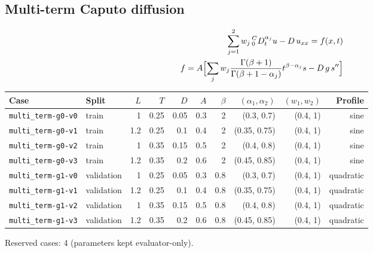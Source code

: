 \documentclass[11pt]{article}
\newcommand{\Caputo}[1]{{}^{C}_{0}D_t^{#1}}
\begin{document}
\subsection{Multi-term Caputo diffusion}
\begin{align*}
\sum_{j=1}^{2} w_j\,\Caputo{\alpha_j}u - D\,u_{xx} = f(x,t)\\
f = A\Bigl[\sum_j w_j\frac{\Gamma(\beta+1)}{\Gamma(\beta+1-\alpha_j)}t^{\beta-\alpha_j}s - D\,g\,s''\Bigr]
\end{align*}
\begin{center}\small
\begin{tabular}{llrrrrrrrr}
\toprule
Case & Split & $L$ & $T$ & $D$ & $A$ & $\beta$ & $(\alpha_1,\alpha_2)$ & $(w_1,w_2)$ & Profile \\
\midrule
\texttt{multi\_term-g0-v0} & train & 1 & 0.25 & 0.05 & 0.3 & 2 & (0.3, 0.7) & (0.4, 1) & sine \\
\texttt{multi\_term-g0-v1} & train & 1.2 & 0.25 & 0.1 & 0.4 & 2 & (0.35, 0.75) & (0.4, 1) & sine \\
\texttt{multi\_term-g0-v2} & train & 1 & 0.35 & 0.15 & 0.5 & 2 & (0.4, 0.8) & (0.4, 1) & sine \\
\texttt{multi\_term-g0-v3} & train & 1.2 & 0.35 & 0.2 & 0.6 & 2 & (0.45, 0.85) & (0.4, 1) & sine \\
\texttt{multi\_term-g1-v0} & validation & 1 & 0.25 & 0.05 & 0.3 & 0.8 & (0.3, 0.7) & (0.4, 1) & quadratic \\
\texttt{multi\_term-g1-v1} & validation & 1.2 & 0.25 & 0.1 & 0.4 & 0.8 & (0.35, 0.75) & (0.4, 1) & quadratic \\
\texttt{multi\_term-g1-v2} & validation & 1 & 0.35 & 0.15 & 0.5 & 0.8 & (0.4, 0.8) & (0.4, 1) & quadratic \\
\texttt{multi\_term-g1-v3} & validation & 1.2 & 0.35 & 0.2 & 0.6 & 0.8 & (0.45, 0.85) & (0.4, 1) & quadratic \\
\bottomrule
\end{tabular}
\end{center}
\noindent Reserved cases: 4 (parameters kept evaluator-only).
\end{document}
